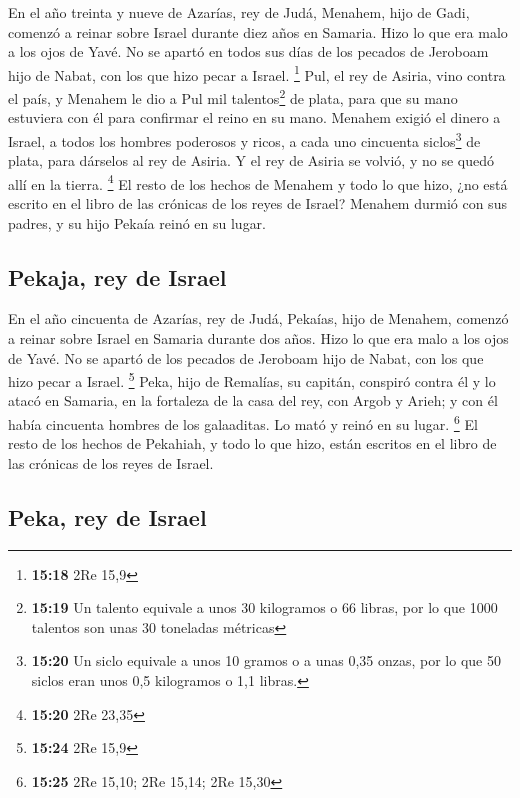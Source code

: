  En el año treinta y nueve de Azarías, rey de Judá,
Menahem, hijo de Gadi, comenzó a reinar sobre Israel durante diez años
en Samaria.  Hizo lo que era malo a los ojos de Yavé. No
se apartó en todos sus días de los pecados de Jeroboam hijo de Nabat,
con los que hizo pecar a Israel. \footnote{\textbf{15:18} 2Re 15,9}
 Pul, el rey de Asiria, vino contra el país, y Menahem le
dio a Pul mil talentos\footnote{\textbf{15:19} Un talento equivale a
  unos 30 kilogramos o 66 libras, por lo que 1000 talentos son unas 30
  toneladas métricas} de plata, para que su mano estuviera con él para
confirmar el reino en su mano.  Menahem exigió el dinero
a Israel, a todos los hombres poderosos y ricos, a cada uno cincuenta
siclos\footnote{\textbf{15:20} Un siclo equivale a unos 10 gramos o a
  unas 0,35 onzas, por lo que 50 siclos eran unos 0,5 kilogramos o 1,1
  libras.} de plata, para dárselos al rey de Asiria. Y el rey de Asiria
se volvió, y no se quedó allí en la tierra. \footnote{\textbf{15:20} 2Re
  23,35}  El resto de los hechos de Menahem y todo lo que
hizo, ¿no está escrito en el libro de las crónicas de los reyes de
Israel?  Menahem durmió con sus padres, y su hijo Pekaía
reinó en su lugar.

\hypertarget{pekaja-rey-de-israel}{%
\subsection{Pekaja, rey de Israel}\label{pekaja-rey-de-israel}}

 En el año cincuenta de Azarías, rey de Judá, Pekaías,
hijo de Menahem, comenzó a reinar sobre Israel en Samaria durante dos
años.  Hizo lo que era malo a los ojos de Yavé. No se
apartó de los pecados de Jeroboam hijo de Nabat, con los que hizo pecar
a Israel. \footnote{\textbf{15:24} 2Re 15,9}  Peka, hijo
de Remalías, su capitán, conspiró contra él y lo atacó en Samaria, en la
fortaleza de la casa del rey, con Argob y Arieh; y con él había
cincuenta hombres de los galaaditas. Lo mató y reinó en su lugar.
\footnote{\textbf{15:25} 2Re 15,10; 2Re 15,14; 2Re 15,30}
 El resto de los hechos de Pekahiah, y todo lo que hizo,
están escritos en el libro de las crónicas de los reyes de Israel.

\hypertarget{peka-rey-de-israel}{%
\subsection{Peka, rey de Israel}\label{peka-rey-de-israel}}

